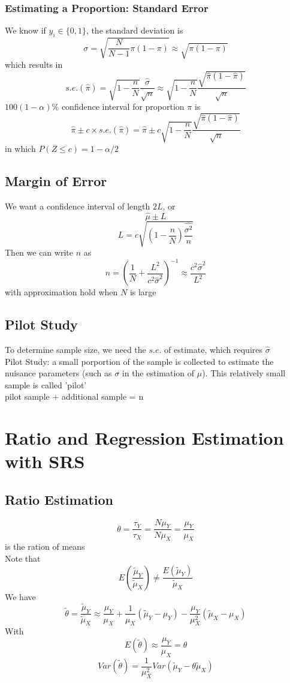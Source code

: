 \documentclass[11pt]{article}
\begin{document}
\subsubsection*{Estimating a Proportion: Standard Error}
We know if $y_i\in\{0,1\}$, the standard deviation is 
\[\sigma=\sqrt{\frac{N}{N-1}\pi(1-\pi)}\approx\sqrt{\pi(1-\pi)}\]
which results in 
\[s.e.(\hat{\pi})=\sqrt{1-\frac{n}{N}}\frac{\hat{\sigma}}{\sqrt{n}}\approx \sqrt{1-\frac{n}{N}}\frac{\sqrt{\hat{\pi}(1-\hat{\pi})}}{\sqrt{n}}\]
$100(1-\alpha)\%$ confidence interval for proportion $\pi$ is 
\[\hat{\pi}\pm c\times s.e.(\hat{\pi}) = \hat{\pi}\pm c\sqrt{1-\frac{n}{N}}\frac{\sqrt{\hat{\pi}(1-\hat{\pi})}}{\sqrt{n}}\]
in which $P(Z\leq c)=1-\alpha/2$
\subsection{Margin of Error}
We want a confidence interval of length $2L$, or \[\hat{\mu}\pm L\]
\[L=c\sqrt{(1-\frac{n}{N})\frac{\hat{\sigma^2}}{n}}\]
Then we can write $n$ as \[n=(\frac{1}{N}+\frac{L^2}{c^2\hat{\sigma}^2})^{-1}\approx \frac{c^2\hat{\sigma}^2}{L^2}\]
with approximation hold when $N$ is large 
\subsection{Pilot Study}
To determine sample size, we need the $s.e.$ of estimate, which requires $\hat{\sigma}$ \\
Pilot Study: a small porportion of the sample is collected to estimate the nuisance parameters (such as $\sigma$ in the estimation of $\mu$). This relatively small sample is called 'pilot' \\
pilot sample + additional sample = n

\section{Ratio and Regression Estimation with SRS}
\subsection{Ratio Estimation}
\[\theta=\frac{\tau_Y}{\tau_X}=\frac{N\mu_Y}{N\mu_X}=\frac{\mu_Y}{\mu_X}\] is the ration of means \\
Note that 
\[E(\frac{\tilde{\mu}_Y}{\tilde{\mu}_X}) \neq \frac{E(\tilde{\mu}_Y)}{\tilde{\mu}_X}\]
We have \[\tilde{\theta}=\frac{\tilde{\mu}_Y}{\tilde{\mu}_X}\approx\frac{\mu_Y}{\mu_X}+\frac{1}{\mu_X}(\tilde{\mu}_Y-\mu_Y)-\frac{\mu_Y}{\mu_X^2}(\tilde{\mu}_X-\mu_X)\]
With \[E(\tilde{\theta})\approx\frac{\mu_Y}{\mu_X}=\theta\]
\[Var(\tilde{\theta})=\frac{1}{\mu^2_X}Var(\tilde{\mu}_Y-\theta\tilde{\mu}_X)\]
\end{document}
